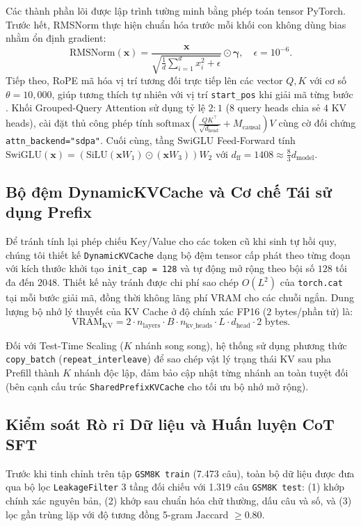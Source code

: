 Các thành phần lõi được lập trình tường minh bằng phép toán tensor PyTorch. Trước hết, RMSNorm thực hiện chuẩn hóa trước mỗi khối con không dùng bias nhằm ổn định gradient:
\begin{equation}
    \text{RMSNorm}(\mathbf{x}) = \frac{\mathbf{x}}{\sqrt{\frac{1}{d}\sum_{i=1}^{d} x_i^2 + \epsilon}} \odot \boldsymbol{\gamma}, \quad \epsilon = 10^{-6}.
\end{equation}
Tiếp theo, RoPE mã hóa vị trí tương đối trực tiếp lên các vector $Q, K$ với cơ số $\theta = 10{,}000$, giúp tương thích tự nhiên với vị trí \texttt{start\_pos} khi giải mã từng bước \cite{su2021roformer}. Khối Grouped-Query Attention sử dụng tỷ lệ $2:1$ ($8$ query heads chia sẻ $4$ KV heads), cài đặt thủ công phép tính $\text{softmax}\!\left(\frac{QK^\top}{\sqrt{d_{\text{head}}}} + M_{\text{causal}}\right)V$ cùng cờ đối chứng \texttt{attn\_backend="sdpa"}. Cuối cùng, tầng SwiGLU Feed-Forward tính $\text{SwiGLU}(\mathbf{x}) = (\text{SiLU}(\mathbf{x}W_1) \odot (\mathbf{x}W_3))W_2$ với $d_{\text{ff}} = 1408 \approx \frac{8}{3}d_{\text{model}}$.

\subsection{Bộ đệm DynamicKVCache và Cơ chế Tái sử dụng Prefix}
Để tránh tính lại phép chiếu Key/Value cho các token cũ khi sinh tự hồi quy, chúng tôi thiết kế \texttt{DynamicKVCache} dạng bộ đệm tensor cấp phát theo từng đoạn với kích thước khởi tạo \texttt{init\_cap = 128} và tự động mở rộng theo bội số $128$ tối đa đến $2048$. Thiết kế này tránh được chi phí sao chép $O(L^2)$ của \texttt{torch.cat} tại mỗi bước giải mã, đồng thời không lãng phí VRAM cho các chuỗi ngắn. Dung lượng bộ nhớ lý thuyết của KV Cache ở độ chính xác FP16 ($2$ bytes/phần tử) là:
\begin{equation}
    \text{VRAM}_{\text{KV}} = 2 \cdot n_{\text{layers}} \cdot B \cdot n_{\text{kv\_heads}} \cdot L \cdot d_{\text{head}} \cdot 2 \text{ bytes}.
\end{equation}

Đối với Test-Time Scaling ($K$ nhánh song song), hệ thống sử dụng phương thức \texttt{copy\_batch} (\texttt{repeat\_interleave}) để sao chép vật lý trạng thái KV sau pha Prefill thành $K$ nhánh độc lập, đảm bảo cập nhật từng nhánh an toàn tuyệt đối (bên cạnh cấu trúc \texttt{SharedPrefixKVCache} cho tối ưu bộ nhớ mở rộng).

\subsection{Kiểm soát Rò rỉ Dữ liệu và Huấn luyện CoT SFT}
Trước khi tinh chỉnh trên tập \texttt{GSM8K train} (7.473 câu), toàn bộ dữ liệu được đưa qua bộ lọc \texttt{LeakageFilter} 3 tầng đối chiếu với 1.319 câu \texttt{GSM8K test}: (1) khớp chính xác nguyên bản, (2) khớp sau chuẩn hóa chữ thường, dấu câu và số, và (3) lọc gần trùng lặp với độ tương đồng 5-gram Jaccard $\ge 0.80$.

